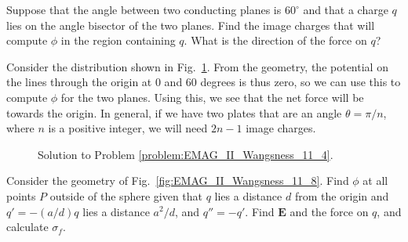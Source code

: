                 \begin{problem}
                    \label{problem:EMAG_II_Wangsness_11_4}
                    Suppose that the angle between two conducting planes
                    is $60^{\circ}$ and that a charge $q$ lies on the
                    angle bisector of the two planes. Find the image
                    charges that will compute $\phi$ in the region
                    containing $q$. What is the direction of the force
                    on $q$?
                \end{problem}
                \begin{solution}
                    Consider the distribution shown in
                    Fig.~\ref{fig:EMAG_II_Wangsness_11_4}. From the
                    geometry, the potential on the lines through the
                    origin at $0$ and $60$ degrees is thus zero, so we
                    can use this to compute $\phi$ for the two planes.
                    Using this, we see that the net force will be
                    towards the origin. In general, if we have two plates
                    that are an angle $\theta=\pi/n$, where $n$ is a
                    positive integer, we will need $2n-1$ image charges.
                \end{solution}
                \begin{figure}[H]
                    \centering
                    \captionsetup{type=figure}
                    
                    \caption{Solution to Problem
                             \ref{problem:EMAG_II_Wangsness_11_4}.}
                    \label{fig:EMAG_II_Wangsness_11_4}
                \end{figure}
                \begin{problem}
                    \label{problem:EMAG_II_Wangsness_11_8}
                    Consider the geometry of
                    Fig.~\ref{fig:EMAG_II_Wangsness_11_8}. Find
                    $\phi$ at all points $P$ outside of the
                    sphere given that $q$ lies a distance $d$ from the
                    origin and $q'=\minus(a/d)q$ lies a distance
                    $a^{2}/d$, and $q''=\minus{q}'$. Find
                    $\mathbf{E}$ and the force on $q$, and
                    calculate $\sigma_{f}$.
                \end{problem}

